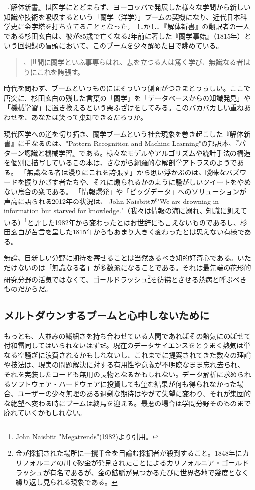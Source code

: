 『解体新書』は医学にとどまらず、ヨーロッパで発展した様々な学問から新しい知識や技術を吸収するという「蘭学（洋学）」ブームの契機になり、近代日本科学史に金字塔を打ち立てることとなった。
しかし、『解体新書』の翻訳者の一人である杉田玄白は、彼が85歳で亡くなる2年前に著した『蘭学事始』（1815年）という回想録の冒頭において、このブームを少々醒めた目で眺めている。

\begin{quote}
、世間に蘭学といふ事専らはれ、志を立つる人は篤く学び、無識なる者はりにこれを誇張す。
\end{quote}

時代を問わず、ブームというものにはそういう側面がつきまとうらしい。ここで唐突に、杉田玄白の残した言葉の「蘭学」を「データベースからの知識発見」や「機械学習」に置き換えるという悪ふざけをしてみる。このバカバカしい重ねあわせを、あなたは笑って棄却できるだろうか。

現代医学への道を切り拓き、蘭学ブームという社会現象を巻き起こした『解体新書』に重なるのは、"Pattern Recognition and Machine Learning"の邦訳本、『パターン認識と機械学習』である。様々なモデルやアルゴリズムや統計手法の構造を個別に描写しているこの本は、さながら網羅的な解剖学アトラスのようである。
「無識なる者は漫りにこれを誇張す」から思い浮かぶのは、曖昧なバズワードを振りかざす者たちや、それに煽られるかのように騒がしいツイートをやめない烏合の衆である。
「情報爆発」や「ビッグデータ」へのソリューションが声高に語られる2012年の状況は、
John Naisbittが"We are drowning in information but starved for knowledge."（我々は情報の海に溺れ、知識に飢えている）\footnote{John Naisbitt "Megatrends"(1982)より引用。}と評した1982年から変わったとはお世辞にも言えないものであるし、杉田玄白が苦言を呈した1815年からもあまり大きく変わったとは思えない有様である。

無論、目新しい分野に期待を寄せることは当然あるべき知的好奇心である。いただけないのは「無識なる者」が多数派になることである。それは最先端の花形的研究分野の活気ではなくて、ゴールドラッシュ\footnote{金が採掘された場所に一攫千金を目論む採掘者が殺到すること。1848年にカリフォルニアの川で砂金が発見されたことによるカリフォルニア・ゴールドラッシュが有名であるが、金の鉱脈が見つかるたびに世界各地で幾度となく繰り返し見られる現象である。}を彷彿とさせる熱病と呼ぶべきものだからだ。

\subsection{メルトダウンするブームと心中しないために}
もっとも、人並みの繊細さを持ち合わせている人間であればその熱気にのぼせて付和雷同してはいられないはずだ。現在のデータサイエンスをとりまく熱気は単なる空騒ぎに浪費されるかもしれないし、これまでに提案されてきた数々の理論や技法は、現実の問題解決に対する有用性や意義が不明瞭なまま忘れ去られ、それを実装したコードも無用の長物となるかもしれない。データ解析に求められるソフトウェア・ハードウェアに投資しても望む結果が何も得られなかった場合、ユーザーの少々無理のある過剰な期待はやがて失望に変わり、それが集団的な絶望へ変わる時にブームは終焉を迎える。最悪の場合は学問分野そのものまで廃れていくかもしれない。

